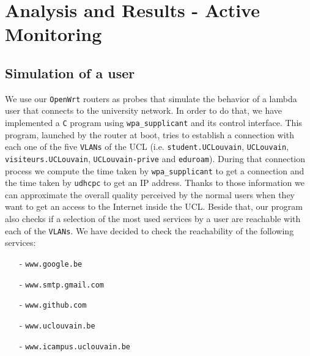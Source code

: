 
\chapter{Analysis and Results - Active Monitoring} %

\label{Chapter6} %





\section{Simulation of a user}
We use our \texttt{OpenWrt} routers as probes that simulate the behavior of a lambda user that connects to the university network. In order to do that, we have implemented a \texttt{C} program using \texttt{wpa\_supplicant} and its control interface. This program, launched by the router at boot, tries to establish a connection with each one of the five \texttt{VLANs} of the UCL (i.e. \texttt{student.UCLouvain}, \texttt{UCLouvain}, \texttt{visiteurs.UCLouvain}, \texttt{UCLouvain-prive} and \texttt{eduroam}). During that connection process we compute the time taken by \texttt{wpa\_supplicant} to get a connection and the time taken by \texttt{udhcpc} to get an IP address. Thanks to those information we can approximate the overall quality perceived by the normal users when they want to get an access to the Internet inside the UCL. Beside that, our program also checks if a selection of the most used services by a user are reachable with each of the \texttt{VLANs}. We have decided to check the reachability of the following services:
\begin{itemize}
	\item[-] \texttt{www.google.be}
	\item[-] \texttt{www.smtp.gmail.com}
	\item[-] \texttt{www.github.com}
	\item[-] \texttt{www.uclouvain.be}
	\item[-] \texttt{www.icampus.uclouvain.be}
\end{itemize}

